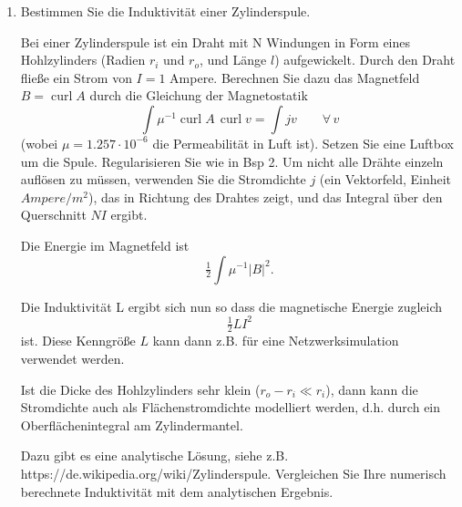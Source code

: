 \documentclass[11pt,a4paper]{report}
\newcommand{\opcurl}{\operatorname{curl}}
\begin{document}
\begin{enumerate}
\item Bestimmen Sie die Induktivit\"at einer Zylinderspule.

Bei einer Zylinderspule ist ein Draht mit N Windungen in Form eines
Hohlzylinders (Radien $r_i$ und $r_o$, und L\"ange $l$)
aufgewickelt. Durch den Draht flie\ss{}e ein Strom von $I = 1$ Ampere.
Berechnen Sie dazu das Magnetfeld $B = \opcurl A$ durch die
Gleichung der Magnetostatik
$$
\int \mu^{-1} \opcurl A \, \opcurl v = \int j v \qquad \forall \, v
$$
(wobei $\mu = 1.257 \cdot 10^{-6}$ die Permeabilit\"at in Luft
ist). Setzen Sie eine Luftbox um die Spule.
Regularisieren Sie wie in Bsp 2. Um nicht alle Dr\"ahte
einzeln aufl\"osen zu m\"ussen, verwenden Sie die Stromdichte $j$ (ein
Vektorfeld, Einheit $Ampere / m^2$), das in Richtung des Drahtes zeigt,
und das Integral \"uber den Querschnitt $N I $ ergibt.

Die Energie im Magnetfeld ist
$$
\tfrac{1}{2}  \int \mu^{-1} | B |^2.
$$

Die Induktivit\"at L ergibt sich nun so dass die magnetische Energie zugleich
$$
\tfrac{1}{2} L I^2
$$
ist. Diese Kenngr\"o\ss{}e $L$ kann dann z.B. f\"ur eine
Netzwerksimulation verwendet werden.

Ist die Dicke des Hohlzylinders sehr klein ($r_o - r_i \ll r_i$), dann
kann die Stromdichte auch als Fl\"achenstromdichte 
modelliert werden, d.h. durch ein Oberfl\"achenintegral am Zylindermantel.

Dazu gibt es eine analytische L\"osung, siehe z.B.
  https://de.wikipedia.org/wiki/Zylinderspule. Vergleichen Sie Ihre
  numerisch berechnete Induktivit\"at mit dem analytischen Ergebnis.
  
\end{enumerate}

\bigskip
\end{document}
